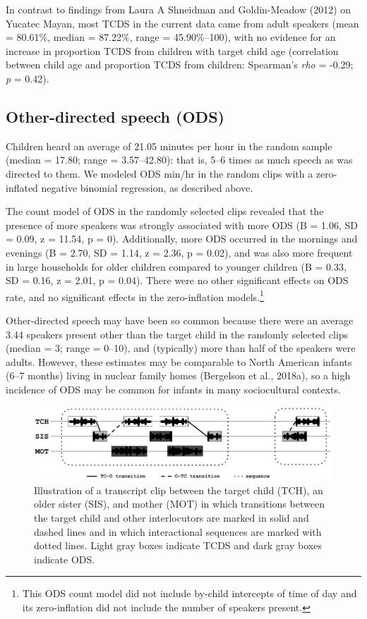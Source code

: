 \documentclass[floatsintext,man]{apa6}
\theoremstyle{definition}
\theoremstyle{definition}
\theoremstyle{definition}
\theoremstyle{remark}
\begin{document}
In contrast to findings from Laura A Shneidman and Goldin-Meadow (2012)
on Yucatec Mayan, most TCDS in the current data came from adult speakers
(mean = 80.61\%, median = 87.22\%, range = 45.90\%--100), with no
evidence for an increase in proportion TCDS from children with target
child age (correlation between child age and proportion TCDS from
children: Spearman's \emph{rho} = -0.29; \emph{p} = 0.42).

\subsection{Other-directed speech
(ODS)}\label{other-directed-speech-ods}

Children heard an average of 21.05 minutes per hour in the random sample
(median = 17.80; range = 3.57--42.80): that is, 5--6 times as much
speech as was directed to them. We modeled ODS min/hr in the random
clips with a zero-inflated negative binomial regression, as described
above.

The count model of ODS in the randomly selected clips revealed that the
presence of more speakers was strongly associated with more ODS (B =
1.06, SD = 0.09, z = 11.54, p = 0). Additionally, more ODS occurred in
the mornings and evenings (B = 2.70, SD = 1.14, z = 2.36, p = 0.02), and
was also more frequent in large households for older children compared
to younger children (B = 0.33, SD = 0.16, z = 2.01, p = 0.04). There
were no other significant effects on ODS rate, and no significant
effects in the zero-inflation models.\footnote{This ODS count model did
  not include by-child intercepts of time of day and its zero-inflation
  did not include the number of speakers present.}

Other-directed speech may have been so common because there were an
average 3.44 speakers present other than the target child in the
randomly selected clips (median = 3; range = 0--10), and (typically)
more than half of the speakers were adults. However, these estimates may
be comparable to North American infants (6--7 months) living in nuclear
family homes (Bergelson et al., 2018a), so a high incidence of ODS may
be common for infants in many sociocultural contexts.

\begin{figure}
\includegraphics[width=1\linewidth]{Tseltal-CLE_files/TseltalCLE-TurnTimingIllustration} \caption{Illustration of a transcript clip between the target child (TCH), an older sister (SIS), and mother (MOT) in which transitions between the target child and other interlocutors are marked in solid and dashed lines and in which interactional sequences are marked with dotted lines. Light gray boxes indicate TCDS and dark gray boxes indicate ODS.}\label{fig:fig6}
\end{figure}
\end{document}
